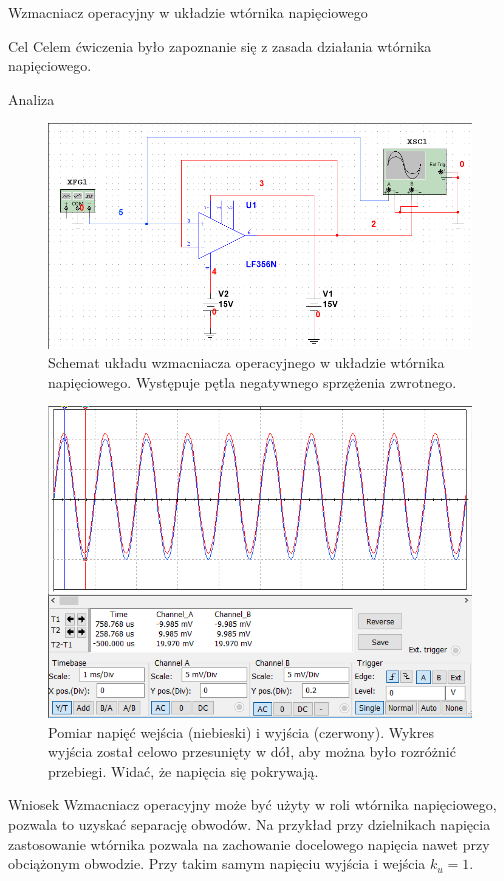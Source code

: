 \documentclass[a4paper]{scrartcl}
\begin{document}
	\begin{section}{Wzmacniacz operacyjny w układzie wtórnika napięciowego}
		\begin{subsection}{Cel}
			Celem ćwiczenia było zapoznanie się z zasada działania wtórnika napięciowego.
		\end{subsection}
		\begin{subsection}{Analiza}
				\begin{figure}[ht]
				\begin{center}
					\includegraphics[width=0.65\linewidth]{06-circuit}
					\caption{Schemat układu wzmacniacza operacyjnego w układzie wtórnika napięciowego. Występuje pętla negatywnego sprzężenia zwrotnego.}
				\end{center}
				\end{figure}
				\begin{figure}[!ht]
				\begin{center}
					\includegraphics[width=0.6\linewidth]{06-osc}
					\caption{Pomiar napięć wejścia (niebieski) i wyjścia (czerwony). Wykres wyjścia został celowo przesunięty w dół, aby można było rozróżnić przebiegi. Widać, że napięcia się pokrywają.}
				\end{center}
				\end{figure}
				\pagebreak
		\end{subsection}
		\pagebreak
		\begin{subsection}{Wniosek}
			Wzmacniacz operacyjny może być użyty w roli wtórnika napięciowego, pozwala to uzyskać separację obwodów. Na przykład przy dzielnikach napięcia zastosowanie wtórnika pozwala na zachowanie docelowego napięcia nawet przy obciążonym obwodzie. Przy takim samym napięciu wyjścia i wejścia $ k_{u} = 1 $.
		\end{subsection}
	\end{section}
\end{document}
